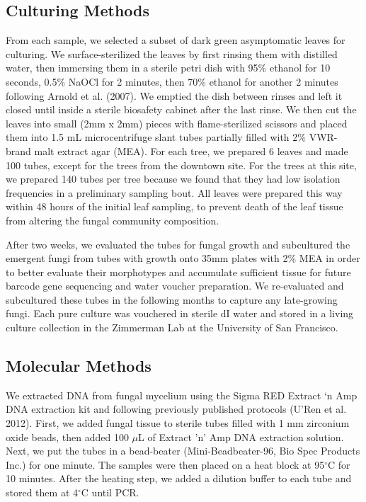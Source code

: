 \documentclass[fleqn,10pt,lineno]{wlpeerj} %
\begin{document}
\hypertarget{culturing-methods}{%
\subsection*{Culturing Methods}\label{culturing-methods}}

From each sample, we selected a subset of dark green asymptomatic leaves for culturing. We surface-sterilized the leaves by first rinsing them with distilled water, then immersing them in a sterile petri dish with 95\% ethanol for 10 seconds, 0.5\% NaOCl for 2 minutes, then 70\% ethanol for another 2 minutes following Arnold et al. (2007). We emptied the dish between rinses and left it closed until inside a sterile biosafety cabinet after the last rinse. We then cut the leaves into small (2mm x 2mm) pieces with flame-sterilized scissors and placed them into 1.5 mL microcentrifuge slant tubes partially filled with 2\% VWR-brand malt extract agar (MEA). For each tree, we prepared 6 leaves and made 100 tubes, except for the trees from the downtown site. For the trees at this site, we prepared 140 tubes per tree because we found that they had low isolation frequencies in a preliminary sampling bout. All leaves were prepared this way within 48 hours of the initial leaf sampling, to prevent death of the leaf tissue from altering the fungal community composition.

After two weeks, we evaluated the tubes for fungal growth and subcultured the emergent fungi from tubes with growth onto 35mm plates with 2\% MEA in order to better evaluate their morphotypes and accumulate sufficient tissue for future barcode gene sequencing and water voucher preparation. We re-evaluated and subcultured these tubes in the following months to capture any late-growing fungi. Each pure culture was vouchered in sterile dI water and stored in a living culture collection in the Zimmerman Lab at the University of San Francisco.

\hypertarget{molecular-methods}{%
\subsection*{Molecular Methods}\label{molecular-methods}}

We extracted DNA from fungal mycelium using the Sigma RED Extract `n Amp DNA extraction kit and following previously published protocols (U'Ren et al. 2012). First, we added fungal tissue to sterile tubes filled with 1 mm zirconium oxide beads, then added 100 \(\mu\)L of Extract 'n' Amp DNA extraction solution. Next, we put the tubes in a bead-beater (Mini-Beadbeater-96, Bio Spec Products Inc.) for one minute. The samples were then placed on a heat block at 95\(^{\circ}\)C for 10 minutes. After the heating step, we added a dilution buffer to each tube and stored them at 4\(^{\circ}\)C until PCR.
\end{document}
